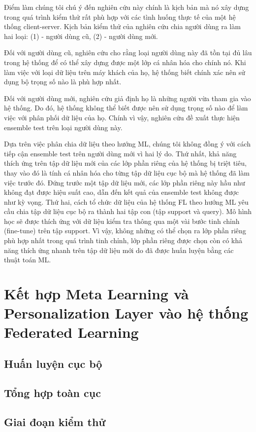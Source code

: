 Điểm làm chúng tôi chú ý đến nghiên cứu này chính là kịch bản mà nó xây dựng trong quá trình kiểm thử rất phù hợp với các tình huống thực tế của một hệ thống client-server. Kịch bản kiểm thử của nghiên cứu \cite{liang2020think} chia người dùng ra làm hai loại: (1) - người dùng cũ, (2) - người dùng mới.

Đối với người dùng cũ, nghiên cứu cho rằng loại người dùng này đã tồn tại đủ lâu trong hệ thống để có thể xây dựng được một lớp cá nhân hóa cho chính nó. Khi làm việc với loại dữ liệu trên máy khách của họ, hệ thống biết chính xác nên sử dụng bộ trọng số nào là phù hợp nhất.

Đối với người dùng mới, nghiên cứu giả định họ là những người vừa tham gia vào hệ thống. Do đó, hệ thống không thể biết được nên sử dụng trọng số nào để làm việc với phân phối dữ liệu của họ. Chính vì vậy, nghiên cứu đề xuất thực hiện ensemble test trên loại người dùng này.

Dựa trên việc phân chia dữ liệu theo hướng ML, chúng tôi không đồng ý với cách tiếp cận ensemble test trên người dùng mới vì hai lý do. Thứ nhất, khả năng thích ứng trên tập dữ liệu mới của các lớp phần riêng của hệ thống bị triệt tiêu, thay vào đó là tính cá nhân hóa cho từng tập dữ liệu cục bộ mà hệ thống đã làm việc trước đó. Đứng trước một tập dữ liệu mới, các lớp phần riêng này hầu như không đạt được hiệu suất cao, dẫn đến kết quả của ensemble test không được như kỳ vọng. Thứ hai, cách tổ chức dữ liệu của hệ thống FL theo hướng ML yêu cầu chia tập dữ liệu cục bộ ra thành hai tập con (tập support và query). Mô hình học sẽ được thích ứng với dữ liệu kiểm tra thông qua một vài bước tinh chỉnh (fine-tune) trên tập support. Vì vậy, không những có thể chọn ra lớp phần riêng phù hợp nhất trong quá trình tinh chỉnh, lớp phần riêng được chọn còn có khả năng thích ứng nhanh trên tập dữ liệu mới do đã được huấn luyện bằng các thuật toán ML.


\section{Kết hợp Meta Learning và Personalization Layer vào hệ thống Federated Learning}

\subsection{Huấn luyện cục bộ}

\subsection{Tổng hợp toàn cục}

\subsection{Giai đoạn kiểm thử}

